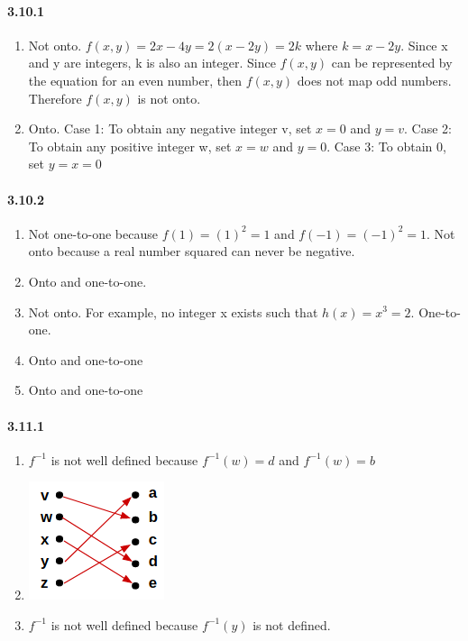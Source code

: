\documentclass[11pt, letterpaper, twocolumn, fleqn]{article}
\begin{document}
    \paragraph{3.10.1}
    \renewcommand{\labelenumi}{\alph{enumi}.}
    \begin{enumerate}
        \item Not onto. $f(x,y)=2x-4y=2(x-2y)=2k$ where $k=x-2y$. Since x and y are integers, k is also an integer. Since $f(x,y)$ can be represented by the equation for an even number, then $f(x,y)$ does not map odd numbers. Therefore $f(x,y)$ is not onto.
        \item Onto. \newline
        Case 1: To obtain any negative integer v, set $x = 0$ and $y = v$. \newline
        Case 2: To obtain any positive integer w, set $x=w$ and $y = 0$. \newline
        Case 3: To obtain 0, set $y=x=0$
    \end{enumerate}
    
    \paragraph{3.10.2}
    \renewcommand{\labelenumi}{\alph{enumi}.}
    \begin{enumerate}
        \item Not one-to-one because $f(1)=(1)^2=1$ and $f(-1)=(-1)^2=1$. \newline
        Not onto because a real number squared can never be negative.
        \item Onto and one-to-one.
        \item Not onto. For example, no integer x exists such that $h(x)=x^3=2$. One-to-one.
        \addtocounter{enumi}{2}
        \item Onto and one-to-one
        \addtocounter{enumi}{3}
        \item Onto and one-to-one
    \end{enumerate}
    
    \paragraph{3.11.1}
    \renewcommand{\labelenumi}{\alph{enumi}.}
    \begin{enumerate}
        \item $f^{-1}$ is not well defined because $f^{-1}(w) = d$ and $f^{-1}(w) = b$
        \item \includegraphics{3_11_1b}
        \item $f^{-1}$ is not well defined because $f^{-1}(y)$ is not defined.
    \end{enumerate}
    
\end{document}
